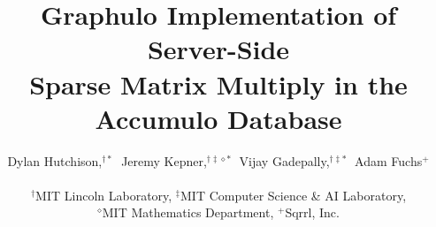 \documentclass[conference]{IEEEtran}
\begin{document}
\title{Graphulo Implementation of Server-Side \\ Sparse Matrix Multiply in the Accumulo Database}



\author[D. Hutchison et al.]
       {Dylan Hutchison,$^{{\dagger}*}\;$ Jeremy Kepner,$^{{\dagger}{\ddagger}{\diamond}*}\;$ Vijay Gadepally,$^{{\dagger}{\ddagger}*}\;$ Adam Fuchs$^+$ \\
         \\
         $^{\dagger}$MIT Lincoln Laboratory, 
         $^{\ddagger}$MIT Computer Science \& AI Laboratory, \\
         $^{\diamond}$MIT Mathematics Department, 
         $^+$Sqrrl, Inc. %
       }


%
\end{document}
